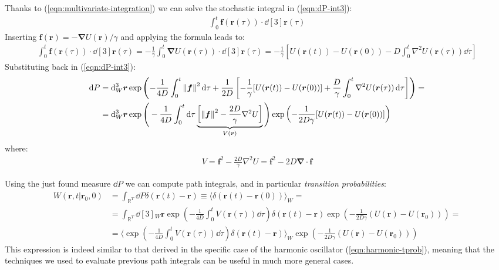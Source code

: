 \documentclass[../template.tex]{subfiles}
\begin{document}
 Thanks to (\ref{eqn:multivariate-integration}) we can solve the stochastic integral in (\ref{eqn:dP-int3}):
 \begin{align*}
     \int_0^t \bm{f}(\bm{r}(\tau)) \cdot \dd[3]{\bm{r}(\tau)}
 \end{align*}
 Inserting $\bm{f}(\bm{r}) = -\bm{\nabla} U(\bm{r})/\gamma$ and applying the formula leads to:
 \begin{align*}
     \int_0^t \bm{f}(\bm{r}(\tau)) \cdot \dd[3]{\bm{r}(\tau)} = -\frac{1}{\gamma} \int_0^t \bm{\nabla} U(\bm{r}(\tau)) \cdot \dd[3]{\bm{r}(\tau)}  = -\frac{1}{\gamma} \left[U(\bm{r}(t)) - U(\bm{r}(0)) - D \int_0^t \nabla^2 U(\bm{r}(\tau)) \dd{\tau}\right] 
 \end{align*} 
 Substituting back in (\ref{eqn:dP-int3}):
\begin{align} \nonumber
    \dd{P} &= \dd[3]{_W \bm{r}} \exp\left(-\frac{1}{4D} \int_0^t \norm{\bm{f}}^2 \dd{\tau} + \frac{1}{2D} \left[-\frac{1}{\gamma} [U(\bm{r}(t)) - U(\bm{r}(0))] + \frac{D}{\gamma} \int_0^t \nabla^2 U(\bm{r}(\tau)) \dd{\tau} \right]  \right) =\\
    &= \dd[3]{_W \bm{r}} \exp \Bigg(-\frac{1}{4D} \int_0^t \dd{\tau} \underbrace{\left[\norm{\bm{f}}^2 - \frac{2D}{\gamma} \nabla^2 U \right]}_{V(\bm{r})}  \Bigg) \exp\left(-\frac{1}{2 D \gamma} [U(\bm{r}(t)) - U(\bm{r}(0))] \right)
    \label{eqn:dP-potential}
\end{align}
where:
 \begin{align*}
     V= \bm{f}^2 - \frac{2D}{\gamma}  \nabla^2 U = \bm{f}^2 - 2D \bm{\nabla} \cdot \bm{f}
 \end{align*}
 
Using the just found measure $\dd{P}$ we can compute path integrals, and in particular \textit{transition probabilities}: 
 \begin{align*}
     W(\bm{r},t | \bm{r}_0, 0) &= \int_{\mathbb{R}^T} \dd{P} \delta(\bm{r}(t) - \bm{r}) \equiv \langle \delta(\bm{r}(t)- \bm{r}(0)) \rangle_W = \\
     &= \int_{\mathbb{R}^T} \dd[3]{_W \bm{r}} \exp\left(-\frac{1}{4D} \int_0^t V(\bm{r}(\tau)) \dd{\tau} \right) \delta(\bm{r}(t) - \bm{r}) \exp\left(-\frac{1}{2D \gamma} (U(\bm{r}) - U(\bm{r}_0))\right) =\\
     &= \langle \exp\left(-\frac{1}{4D} \int_0^t V(\bm{r}(\tau)) \dd{\tau} \right)  \delta (\bm{r}(t) - \bm{r})\rangle_W \exp\left(-\frac{1}{2D \gamma} (U(\bm{r})- U(\bm{r}_0))\right)
 \end{align*}
 This expression is indeed similar to that derived in the specific case of the harmonic oscillator (\ref{eqn:harmonic-tprob}), meaning that the techniques we used to evaluate previous path integrals can be useful in much more general cases.
\end{document}
